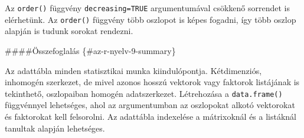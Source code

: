 \documentclass[
]{book}
\makeatletter
\newenvironment{Shaded}{\begin{snugshade}}{\end{snugshade}}
\newcommand{\AttributeTok}[1]{\textcolor[rgb]{0.77,0.63,0.00}{#1}}
\newcommand{\CommentTok}[1]{\textcolor[rgb]{0.56,0.35,0.01}{\textit{#1}}}
\newcommand{\FloatTok}[1]{\textcolor[rgb]{0.00,0.00,0.81}{#1}}
\newcommand{\FunctionTok}[1]{\textcolor[rgb]{0.00,0.00,0.00}{#1}}
\newcommand{\NormalTok}[1]{#1}
\newcommand{\SpecialCharTok}[1]{\textcolor[rgb]{0.00,0.00,0.00}{#1}}
\newenvironment{kframe}{%
\medskip{}
\setlength{\fboxsep}{.8em}
 \def\at@end@of@kframe{}%
 \ifinner\ifhmode%
  \def\at@end@of@kframe{\end{minipage}}%
  \begin{minipage}{\columnwidth}%
 \fi\fi%
 \def\FrameCommand##1{\hskip\@totalleftmargin \hskip-\fboxsep
 \colorbox{shadecolor}{##1}\hskip-\fboxsep
     \hskip-\linewidth \hskip-\@totalleftmargin \hskip\columnwidth}%
 \MakeFramed {\advance\hsize-\width
   \@totalleftmargin\z@ \linewidth\hsize
   \@setminipage}}%
 {\par\unskip\endMakeFramed%
 \at@end@of@kframe}
\newenvironment{rmdblock}[1]
  {
  \begin{itemize}
  \renewcommand{\labelitemi}{
    \raisebox{-.7\height}[0pt][0pt]{
      {\setkeys{Gin}{width=3em,keepaspectratio}\texttt{[image: images/\#1]}}
    }
  }
  \setlength{\fboxsep}{1em}
  \begin{kframe}
  \item
  }
  {
  \end{kframe}
  \end{itemize}
  }
\newenvironment{rmdsummary}
  {\begin{rmdblock}{summary}}
  {\end{rmdblock}}
\makeatother
\begin{document}
\begin{Shaded}
\end{Shaded}

Az \texttt{order()} függvény \texttt{decreasing=TRUE} argumentumával csökkenő sorrendet is elérhetünk. Az \texttt{order()} függvény több oszlopot is képes fogadni, így több oszlop alapján is tudunk sorokat rendezni.

\begin{Shaded}
\end{Shaded}

\#\#\#\#Összefoglalás \{\#az-r-nyelv-9-summary\}

\begin{rmdsummary}
Az adattábla minden statisztikai munka kiindulópontja. Kétdimenziós,
inhomogén szerkezet, de mivel azonos hosszú vektorok vagy faktorok
listájának is tekinthető, oszlopaiban homogén adatszerkezet. Létrehozása
a \texttt{data.frame()} függvénnyel lehetséges, ahol az argumentumban az
oszlopokat alkotó vektorokat és faktorokat kell felsorolni. Az adattábla
indexelése a mátrixoknál és a listáknál tanultak alapján lehetséges.
\end{rmdsummary}
\end{document}
